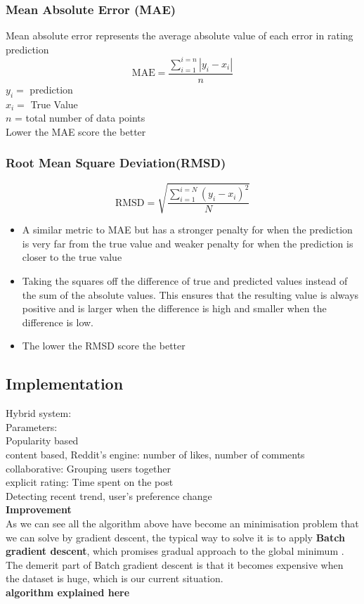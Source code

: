 \subsubsection{Mean Absolute Error (MAE)}
Mean absolute error represents the average absolute value of each error in rating prediction
\begin{equation*}
\text{MAE} = \frac{\sum^{i=n}_{i=1}|y_{i} - x_{i}|}{n}
\end{equation*}
$y_{i}  = $ prediction
\\$x_{i}  = $ True Value
\\$n$ = total number of data points
\\Lower the MAE score the better

\subsubsection{Root Mean Square Deviation(RMSD)}
\begin{equation*}
\text{RMSD} = \sqrt{\frac{\sum^{i=N}_{i=1}(y_{i} - x_{i})^{2}}{N}}
\end{equation*}

\begin{itemize}
\item A similar metric to MAE but has a stronger penalty for when the prediction is very far from the true value and weaker penalty for when the prediction is closer to the true value
\item Taking the squares off the difference of true and predicted values instead of the sum of the absolute values. This ensures that the resulting value is always positive and is larger when the difference is high and smaller when the difference is low.
\item The lower the RMSD score the better
\end{itemize}


\subsection{Implementation}
Hybrid system:
\\Parameters: 
\\Popularity based
\\content based, Reddit's engine:  number of likes, number of comments
\\collaborative: Grouping users together
\\explicit rating: Time spent on the post
\\Detecting recent trend, user's preference change
\\ \textbf{Improvement}
\\ As we can see all the algorithm above have become an minimisation problem that we can solve by gradient descent, the typical way to solve it is to apply \textbf{Batch gradient descent}, which promises gradual approach to the global minimum . The demerit part of Batch gradient descent is that it becomes expensive when the dataset is huge, which is our current situation.
\\ \textbf{algorithm explained here}

